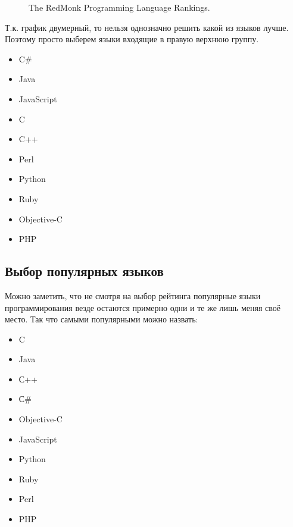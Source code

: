 \begin{figure}[H]
\caption{The RedMonk Programming Language Rankings.}
\label{ris:redmonk}
\end{figure}
Т.к. график двумерный, то нельзя однозначно решить какой из языков лучше. Поэтому просто выберем языки входящие в правую верхнюю группу. 
\begin{itemize}
\item C\#
\item Java
\item JavaScript
\item C
\item C++
\item Perl
\item Python
\item Ruby
\item Objective-C
\item PHP
\end{itemize}
\subsection{Выбор популярных языков}
Можно заметить, что не смотря на выбор рейтинга популярные языки программирования везде остаются примерно одни и те же лишь меняя своё место. 
Так что самыми популярными можно назвать:
\begin{itemize}
\item C
\item Java
\item С++
\item С\#
\item Objective-C
\item JavaScript
\item Python
\item Ruby
\item Perl
\item PHP
\end{itemize}

